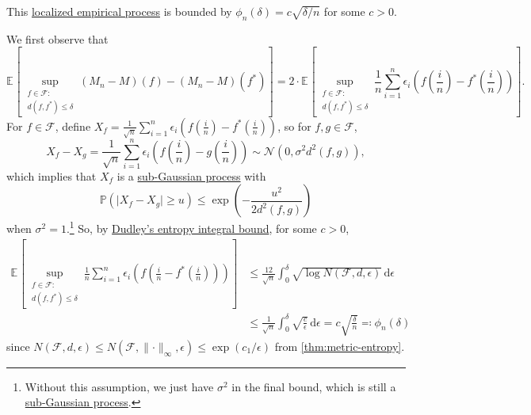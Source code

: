 \begin{claim}
	This \hyperref[def:localized-EP]{localized empirical process} is bounded by \(\phi _n (\delta ) = c \sqrt{\delta / n} \) for some \(c >0\).
\end{claim}
\begin{explanation}
	We first observe that
	\[
		\mathbb{E}_{}\left[\sup _{\substack{f\in \mathscr{F} \colon \\ d(f, f^{\ast} ) \leq \delta } } (M_n - M)(f) - (M_n - M)(f^{\ast} ) \right]
		= 2 \cdot \mathbb{E}_{}\left[\sup _{\substack{f\in \mathscr{F} \colon \\ d(f, f^{\ast} ) \leq \delta } } \frac{1}{n} \sum_{i=1}^{n} \epsilon _i \left( f \left( \frac{i}{n} \right) - f^{\ast} \left( \frac{i}{n} \right) \right) \right] .
	\]
	For \(f\in \mathscr{F} \), define \(X_f = \frac{1}{\sqrt{n} } \sum_{i=1}^{n} \epsilon _i \left( f \left( \frac{i}{n} \right) - f^{\ast} \left( \frac{i}{n} \right)  \right) \), so for \(f, g\in \mathscr{F} \),
	\[
		X_f - X_g = \frac{1}{\sqrt{n} } \sum_{i=1}^{n} \epsilon _i \left( f \left( \frac{i}{n} \right) - g\left( \frac{i}{n} \right)  \right) \sim \mathcal{N} ( 0, \sigma ^2 d^2(f, g) ) ,
	\]
	which implies that \(X_f\) is a \hyperref[def:sub-Gaussian-process]{sub-Gaussian process} with
	\[
		\mathbb{P} ( \vert X_f - X_g \vert \geq u) \leq \exp \left( - \frac{u^2}{2 d^2(f, g)} \right)
	\]
	when \(\sigma ^2 = 1\).\footnote{Without this assumption, we just have \(\sigma ^2\) in the final bound, which is still a \hyperref[def:sub-Gaussian-process]{sub-Gaussian process}.} So, by \hyperref[col:Dudley-integral-entropy-bound]{Dudley's entropy integral bound}, for some \(c> 0\),
	\[
		\begin{split}
			\mathbb{E}_{}\left[\sup _{\substack{f\in \mathscr{F} \colon \\ d(f, f^{\ast} ) \leq \delta } } \frac{1}{n} \sum_{i=1}^{n} \epsilon _i \left( f \left( \frac{i}{n} - f^{\ast} \left( \frac{i}{n} \right)  \right)  \right)  \right]
			&\leq \frac{12}{\sqrt{n} } \int_{0}^{\delta } \sqrt{\log N (\mathscr{F} , d, \epsilon )}  \,\mathrm{d}\epsilon \\
			&\leq \frac{1}{\sqrt{n} } \int_{0}^{\delta } \sqrt{\frac{c}{\epsilon } }  \,\mathrm{d}\epsilon = c \sqrt{\frac{\delta}{n}} \eqqcolon \phi _n (\delta )
		\end{split}
	\]
	since \(N(\mathscr{F} , d, \epsilon ) \leq N(\mathscr{F} , \lVert \cdot \rVert _\infty , \epsilon ) \leq \exp (c_1 / \epsilon )\) from \autoref{thm:metric-entropy}.
\end{explanation}


